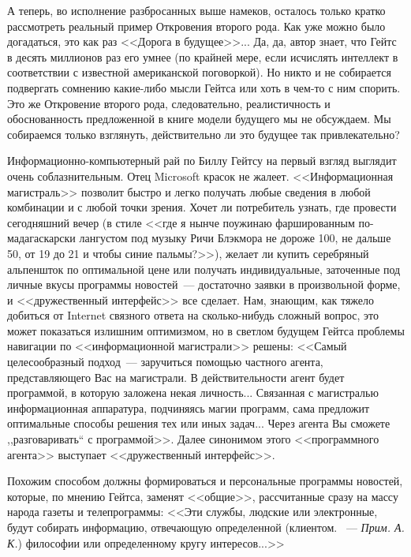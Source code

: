 \documentclass{scrbook}
\newcommand{\glqq}{,,}
\newcommand{\grqq}{``}
\newcommand{\flqq}{<<}
\newcommand{\frqq}{>>}
\newcommand{\mdash}{~--- }
\newcommand{\mycomment}[1]{{\mdash} \textit{#1}}
\begin{document}
А теперь, во исполнение разбросанных выше намеков, осталось только кратко рассмотреть реальный пример Откровения второго рода. Как уже можно было догадаться, это как раз {\flqq}Дорога в будущее{\frqq}... Да, да, автор знает, что Гейтс в десять миллионов раз его умнее (по крайней мере, если исчислять интеллект в соответствии с известной американской поговоркой). Но никто и не собирается подвергать сомнению какие-либо мысли Гейтса или хоть в чем-то с ним спорить. Это же Откровение второго рода, следовательно, реалистичность и обоснованность предложенной в книге модели будущего мы не обсуждаем. Мы собираемся только взглянуть, действительно ли это будущее так привлекательно?

Информационно-компьютерный рай по Биллу Гейтсу на первый взгляд выглядит очень соблазнительным. Отец Microsoft красок не жалеет. {\flqq}Информационная магистраль{\frqq} позволит быстро и легко получать любые сведения в любой комбинации и с любой точки зрения. Хочет ли потребитель узнать, где провести сегодняшний вечер (в стиле {\flqq}где я нынче поужинаю фаршированным по-мадагаскарски лангустом под музыку Ричи Блэкмора не дороже 100, не дальше 50, от 19 до 21 и чтобы синие пальмы?{\frqq}), желает ли купить серебряный альпеншток по оптимальной цене или получать индивидуальные, заточенные под личные вкусы программы новостей{\mdash}достаточно заявки в произвольной форме, и {\flqq}дружественный интерфейс{\frqq} все сделает. Нам, знающим, как тяжело добиться от Internet связного ответа на сколько-нибудь сложный вопрос, это может показаться излишним оптимизмом, но в светлом будущем Гейтса проблемы навигации по {\flqq}информационной магистрали{\frqq} решены: {\flqq}Самый целесообразный подход{\mdash}заручиться помощью частного агента, представляющего Вас на магистрали. В действительности агент будет программой, в которую заложена некая личность... Связанная с магистралью информационная аппаратура, подчиняясь магии программ, сама предложит оптимальные способы решения тех или иных задач... Через агента Вы сможете {\glqq}разговаривать{\grqq} с программой{\frqq}. Далее синонимом этого {\flqq}программного агента{\frqq} выступает {\flqq}дружественный интерфейс{\frqq}.

Похожим способом должны формироваться и персональные программы новостей, которые, по мнению Гейтса, заменят {\flqq}общие{\frqq}, рассчитанные сразу на массу народа газеты и телепрограммы: {\flqq}Эти службы, людские или электронные, будут собирать информацию, отвечающую определенной (клиентом. \mycomment{Прим. А. К.}) философии или определенному кругу интересов...{\frqq}
\end{document}

